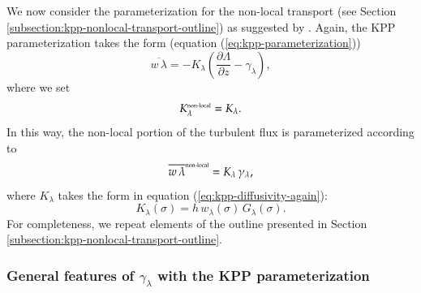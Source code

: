 We now consider the parameterization for the non-local transport (see
Section \ref{subsection:kpp-nonlocal-transport-outline}) as suggested
by \cite{LargeKPP}.  Again, the KPP parameterization takes the form
(equation (\ref{eq:kpp-parameterization}))
\begin{equation}
  \overline{w \, \lambda} = -K_{\lambda} \left( \frac{\partial \Lambda}{\partial z} - \gamma_{\lambda} \right),
\label{eq:kpp-parameterization-yet-again}
\end{equation}
where we set 
\begin{equation}
K^{\mbox{\tiny non-local}}_{\lambda} = K_{\lambda}.
\end{equation}
In this way, the non-local portion of the turbulent flux is
parameterized according to
\begin{equation}
 \overline{w \, \lambda}^{\mbox{\tiny non-local}} = K_{\lambda}  \, \gamma_{\lambda},  
\end{equation}
where $K_{\lambda}$ takes the form in equation
(\ref{eq:kpp-diffusivity-again}): 
\begin{equation}
 K_{\lambda}(\sigma) = h \, w_{\lambda}(\sigma) \, G_{\lambda}(\sigma).
\label{eq:kpp-diffusivity-yet-again}
\end{equation}
For completeness, we repeat elements of the outline presented in
Section \ref{subsection:kpp-nonlocal-transport-outline}.


\subsubsection{General features of $\gamma_{\lambda}$ with the KPP parameterization}
\label{subsubsection:general-features-gamma-as-per-largekpp}


